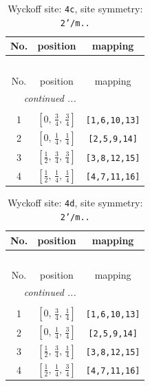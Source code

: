 \documentclass[fleqn,8pt]{jsarticle}
\begin{document}
\renewcommand{\arraystretch}{1.2}
\begin{longtable}{ccc}
\caption{Wyckoff site: {\tt 4c}, site symmetry: {\tt 2'/m..}}
 \\
 \hline \hline
No. & position & mapping \\ \hline \endfirsthead

\multicolumn{2}{l}{\tablename\ \thetable{}} \\
 \hline \hline
No. & position & mapping \\ \hline \endhead

 \hline \hline
\multicolumn{2}{r}{\footnotesize\it continued ...} \\ \endfoot

 \hline \hline
\multicolumn{2}{r}{} \\ \endlastfoot

1 & $\left[ 0,\, \frac{3}{4},\, \frac{3}{4} \right]$ & {\tt [1,6,10,13]} \\ \hline
2 & $\left[ 0,\, \frac{1}{4},\, \frac{1}{4} \right]$ & {\tt [2,5,9,14]} \\ \hline
3 & $\left[ \frac{1}{2},\, \frac{3}{4},\, \frac{3}{4} \right]$ & {\tt [3,8,12,15]} \\ \hline
4 & $\left[ \frac{1}{2},\, \frac{1}{4},\, \frac{1}{4} \right]$ & {\tt [4,7,11,16]} \\
\end{longtable}
\renewcommand{\arraystretch}{1.2}
\begin{longtable}{ccc}
\caption{Wyckoff site: {\tt 4d}, site symmetry: {\tt 2'/m..}}
 \\
 \hline \hline
No. & position & mapping \\ \hline \endfirsthead

\multicolumn{2}{l}{\tablename\ \thetable{}} \\
 \hline \hline
No. & position & mapping \\ \hline \endhead

 \hline \hline
\multicolumn{2}{r}{\footnotesize\it continued ...} \\ \endfoot

 \hline \hline
\multicolumn{2}{r}{} \\ \endlastfoot

1 & $\left[ 0,\, \frac{3}{4},\, \frac{1}{4} \right]$ & {\tt [1,6,10,13]} \\ \hline
2 & $\left[ 0,\, \frac{1}{4},\, \frac{3}{4} \right]$ & {\tt [2,5,9,14]} \\ \hline
3 & $\left[ \frac{1}{2},\, \frac{3}{4},\, \frac{1}{4} \right]$ & {\tt [3,8,12,15]} \\ \hline
4 & $\left[ \frac{1}{2},\, \frac{1}{4},\, \frac{3}{4} \right]$ & {\tt [4,7,11,16]} \\
\end{longtable}
\end{document}
